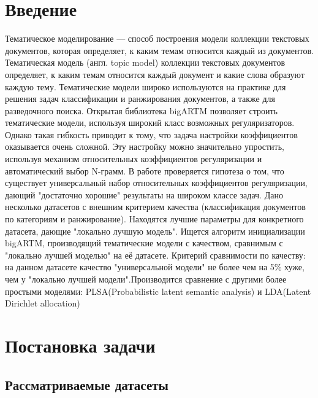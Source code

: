\documentclass{article}
\begin{document}
\section {Введение}
Тематическое моделирование — способ построения модели коллекции текстовых документов, которая определяет, к каким темам относится каждый из документов\cite{wallach2006topic}. Тематическая модель (англ. topic model) коллекции текстовых документов определяет, к каким темам относится каждый документ и какие слова  образуют каждую тему.
Тематические модели широко используются на практике для решения задач классификации и ранжирования документов, а также для разведочного поиска\cite{janina2016}.  
 Открытая библиотека bigARTM\cite{vorontsov2015bigartm}  позволяет строить тематические модели, используя широкий класс возможных регуляризаторов\cite{vorontsov2013veroyat}.  Однако такая гибкость приводит к тому, что задача настройки коэффициентов оказывается очень сложной. Эту настройку можно значительно упростить, используя механизм относительных коэффициентов регуляризации и автоматический выбор N-грамм. В работе проверяется гипотеза о том, что существует универсальный набор относительных коэффициентов регуляризации, дающий "достаточно хорошие" результаты на широком классе задач. Дано несколько датасетов с внешним критерием качества (классификация документов по категориям и ранжирование). Находятся лучшие параметры для конкретного датасета, дающие "локально лучшую модель". Ищется алгоритм инициализации bigARTM, производящий тематические модели с качеством, сравнимым с "локально лучшей моделью" на её датасете. Критерий сравнимости по качеству: на данном датасете качество "универсальной модели" не более чем на 5\% хуже, чем у "локально лучшей модели".Производится сравнение с другими более простыми моделями: PLSA(Probabilistic latent semantic analysis)\cite{hofmann1999probabilistic} и LDA(Latent Dirichlet allocation)\cite{blei2003latent} 
 
\section {Постановка задачи}
\subsection{Рассматриваемые датасеты}
\end{document}
